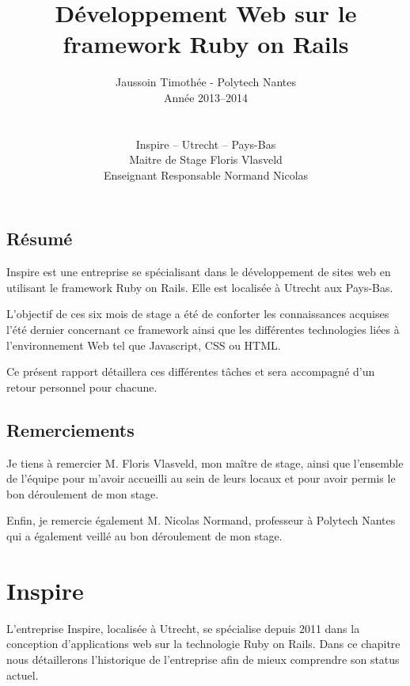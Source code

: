 \documentclass[12pt,a4paper]{book}
\author{Jaussoin Timothée - Polytech Nantes\\ Année 2013--2014 \\
\\ \\ Inspire -- Utrecht -- Pays-Bas\\  Maitre de Stage Floris Vlasveld\\ Enseignant Responsable Normand Nicolas}
\title{Développement Web sur le framework Ruby on Rails}
\begin{document}
\begin{titlepage}
	\maketitle
\end{titlepage}

\tableofcontents

\newpage
\clearpage
{}
    \section*{Résumé}
  Inspire est une entreprise se spécialisant dans le développement de sites web en utilisant le framework Ruby on Rails. Elle est localisée à Utrecht aux Pays-Bas.
  
  L'objectif de ces six mois de stage a été de conforter les connaissances acquises l'été dernier concernant ce framework ainsi que les différentes technologies liées à l'environnement Web tel que Javascript, CSS ou HTML.

    Ce présent rapport détaillera ces différentes tâches et sera accompagné d'un retour personnel pour chacune.  

\newpage
\clearpage
{}
\section*{Remerciements}

Je tiens à remercier M. Floris Vlasveld, mon maître de stage, ainsi que l'ensemble de l'équipe pour m'avoir accueilli au sein de leurs locaux et pour avoir permis le bon déroulement de mon stage.

Enfin, je remercie également M. Nicolas Normand, professeur à Polytech Nantes qui a également veillé au bon déroulement de mon stage.


\chapter{Inspire}

L'entreprise Inspire, localisée à Utrecht, se spécialise depuis 2011 dans la conception d'applications web sur la technologie Ruby on Rails. Dans ce chapitre nous détaillerons l'historique de l'entreprise afin de mieux comprendre son status actuel.
\end{document}
